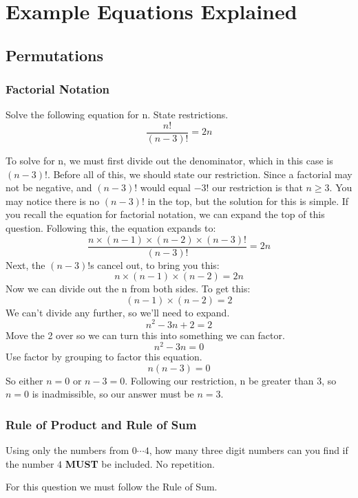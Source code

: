 \section{Example Equations Explained}

    \subsection{Permutations}
        \subsubsection{Factorial Notation}
            \begin{example}
            Solve the following equation for n. State restrictions.
            \[\frac{n!}{(n-3)!}=2n\]
            \end{example}
            To solve for n, we must first divide out the denominator, which in this case is $(n-3)!$. Before all of this, we should state our restriction. Since a factorial may not be negative, and $(n-3)!$ would equal $-3!$ our restriction is that \emph{$n\geqslant3$}. You may notice there is no $(n-3)!$ in the top, but the solution for this is simple. If you recall the equation for factorial notation, we can expand the top of this question.  Following this, the equation expands to:
            \[\frac{n\times(n-1)\times(n-2)\times(n-3)!}{(n-3)!}=2n\]
            Next, the $(n-3)!$s cancel out, to bring you this:
            \[n\times(n-1)\times(n-2) = 2n\]
            Now we can divide out the n from both sides. To get this:
            \[(n-1)\times(n-2) = 2\]
            We can't divide any further, so we'll need to expand.
            \[n^2 -3n+2 = 2\]
            Move the 2 over so we can turn this into something we can factor.
            \[n^2 -3n=0\]
            Use factor by grouping to factor this equation.
            \[n(n-3)=0\]
            So either $n=0$ or $n-3=0$. Following our restriction, n be greater than 3, so $n=0$ is inadmissible, so our answer must be $n=3$.
    \clearpage
        \subsubsection{Rule of Product and Rule of Sum}
            \begin{example}
            Using only the numbers from $0\cdots4$, how many three digit numbers can you find if the number $4$ \textbf{MUST} be included. No repetition.
            \end{example}
            For this question we must follow the Rule of Sum.
            

